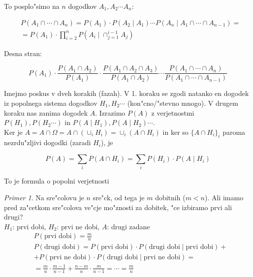 \documentclass[a4paper,12pt]{article}
\theoremstyle{definition}
\theoremstyle{remark}
\newtheorem*{ex}{Primer}
\begin{document}
To posplo"simo na $n$ dogodkov $A_1, A_2 \cdots A_n$:

\begin{align*}
    &P(A_1 \cap \cdots \cap A_n) = P(A_1) \cdot P(A_2 \mid A_1) \cdots P(A_n \mid A_1 \cap \cdots \cap A_{n-1}) = \\
    &= P(A_1) \cdot \prod_{i=2}^{n} P(A_i \mid \cap_{j=1}^{i-1} A_j)
\end{align*}

Desna stran:

\begin{equation*}
    P(A_1) \cdot \frac{P(A_1 \cap A_2)}{P(A_1)} \cdot \frac{P(A_1 \cap A_2 \cap A_3)}{P(A_1 \cap A_2)} \cdots
    \frac{P(A_1 \cap \cdots \cap A_n)}{P(A_1 \cap \cdots \cap A_{n-1})}
\end{equation*}

Imejmo poskus v dveh korakih (fazah). V 1. koraku se zgodi natanko en dogodek iz popolnega sistema dogodkov
$H_1, H_2 \cdots$ (kon"cno/"stevno mnogo). V drugem koraku nas zanima dogodek $A$. Izrazimo $P(A)$ z verjetnostmi
$P(H_1), P(H_2 \cdots)$ in $P(A \mid H_1), P(A \mid H_2) \cdots$. \\
Ker je $A = A \cap \Omega = A \cap (\cup_i H_i) = \cup_i (A \cap H_i)$ in ker so $\{A \cap H_i\}_i$ paroma
nezrdu"zljivi dogodki (zaradi $H_i$), je

\begin{equation*}
    P(A) = \sum_i P(A \cap H_i) = \sum_i P(H_i) \cdot P(A \mid H_i)
\end{equation*}

To je formula o popolni verjetnosti

\begin{ex}
    Na sre"colovu je $n$ sre"ck, od tega je $m$ dobitnih ($m < n$). Ali imamo pred za"cetkom sre"colova ve"cje
    mo"znosti za dobitek, "ce izbiramo prvi ali drugi? \\
    $H_1$: prvi dobi, $H_2$: prvi ne dobi, $A$: drugi zadane \\
    \begin{align*}
        &P(\text{prvi dobi}) = \frac{m}{n} \\
        &P(\text{drugi dobi}) = P(\text{prvi dobi}) \cdot P(\text{drugi dobi} \mid \text{prvi dobi}) + \\
        &+ P(\text{prvi ne dobi}) \cdot P(\text{drugi dobi} \mid \text{prvi ne dobi}) = \\
        &= \frac{m}{n} \cdot \frac{m-1}{n-1} + \frac{n-m}{n} \cdot \frac{m}{n-1} = \cdots = \frac{m}{n} 
    \end{align*}
\end{ex}
\end{document}
